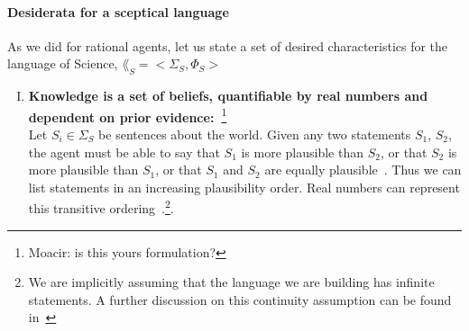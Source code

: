 \paragraph{Desiderata for a sceptical language} As we did for rational agents, let us state a set of desired characteristics for the language of Science, \(\lang_S= <\Sigma_S, \Phi_S>\)
\begin{enumerate}[I.]
	\item \textbf{Knowledge is a set of beliefs, quantifiable by real numbers and dependent on prior evidence:~\cite{sowinski:2016,caticha:2008, jaynes:2003}}\footnote{Moacir: is this yours formulation?} \\
	Let \(S_i \in \Sigma_S\) be sentences about the world. Given any two statements \(S_1\), \(S_2\), the agent must be able to say that \(S_1\) is more plausible than \(S_2\), or that \(S_2\) is more plausible than \(S_1\), or that \(S_1\) and \(S_2\) are equally plausible~\cite{caticha:2008}. Thus we can list statements in an increasing plausibility order. Real numbers can represent this transitive ordering~\cite{caticha:2008}.\footnote{We are implicitly assuming that the language we are building has infinite statements. A further discussion on this continuity assumption can be found in~\cite[p. 26]{sowinski:2016}}.


\end{enumerate}
